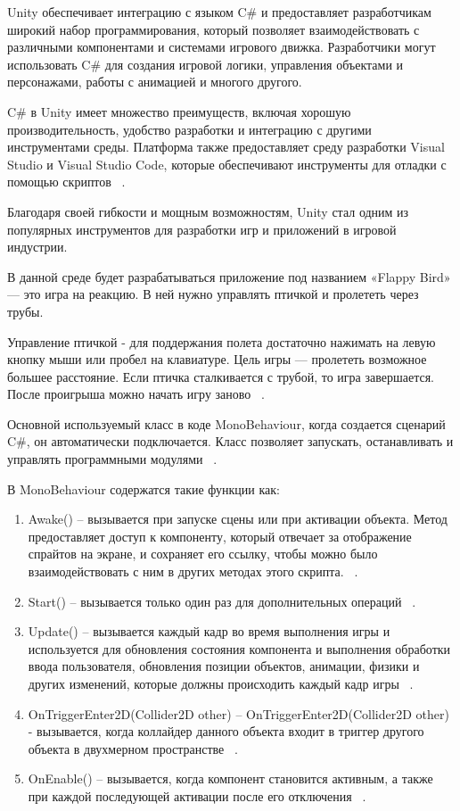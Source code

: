 \documentclass[14pt, oneside]{altsu-report}
\begin{document}
Unity обеспечивает интеграцию с языком C\# и предоставляет разработчикам широкий набор программирования, который позволяет взаимодействовать с различными компонентами и системами игрового движка. Разработчики могут использовать C\# для создания игровой логики, управления объектами и персонажами, работы с анимацией и многого другого. 

C\# в Unity имеет множество преимуществ, включая хорошую производительность, удобство разработки и интеграцию с другими инструментами среды. Платформа также предоставляет среду разработки Visual Studio и Visual Studio Code, которые обеспечивают инструменты для отладки с помощью скриптов ~\cite{Unity3, Unity4}. 

Благодаря своей гибкости и мощным возможностям, Unity стал одним из популярных инструментов для разработки игр и приложений в игровой индустрии.

В данной среде будет разрабатываться приложение под названием «Flappy Bird» — это игра на реакцию. В ней нужно управлять птичкой и пролететь через трубы.

Управление птичкой - для поддержания полета достаточно нажимать на левую кнопку мыши или пробел на клавиатуре. Цель игры — пролететь возможное большее расстояние. Если птичка сталкивается с трубой, то игра завершается. После проигрыша можно начать игру заново ~\cite{Unity10}.

Основной используемый класс в коде MonoBehaviour, когда создается сценарий C\#, он автоматически подключается. Класс позволяет запускать, останавливать и управлять программными модулями ~\cite{Unity6}. 

В MonoBehaviour содержатся такие функции как:

\begin{enumerate}
\item Awake() -- вызывается при запуске сцены или при активации объекта. Метод предоставляет доступ к компоненту, который отвечает за отображение спрайтов на экране, и сохраняет его ссылку, чтобы можно было взаимодействовать с ним в других методах этого скрипта. ~\cite{Unity13}.
\item Start() -- вызывается только один раз для дополнительных операций ~\cite{Unity14}.
\item Update() -- вызывается каждый кадр во время выполнения игры и используется для обновления состояния компонента и выполнения обработки ввода пользователя, обновления позиции объектов, анимации, физики и других изменений, которые должны происходить каждый кадр игры ~\cite{Unity15}.
\item OnTriggerEnter2D(Collider2D other) -- OnTriggerEnter2D(Collider2D other) - вызывается, когда коллайдер данного объекта входит в триггер другого объекта в двухмерном пространстве ~\cite{Unity16}.
\item OnEnable() -- вызывается, когда компонент становится активным, а также при каждой последующей активации после его отключения ~\cite{Unity17}.

\end{enumerate} 
\end{document}
